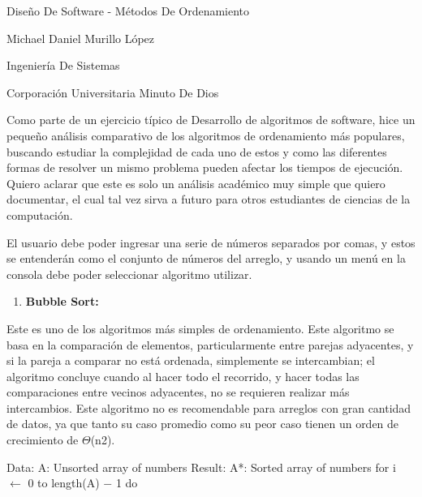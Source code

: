 ﻿\documentclass{article} %
\begin{document}


\noindent 

\noindent 

\noindent 

\noindent 

\noindent 

\noindent Dise\~{n}o De Software - M\'{e}todos De Ordenamiento

\noindent Michael Daniel Murillo L\'{o}pez

\noindent Ingenier\'{i}a De Sistemas

\noindent Corporaci\'{o}n Universitaria Minuto De Dios

\noindent 

\noindent Como parte de un ejercicio t\'{i}pico de Desarrollo de algoritmos de software, hice un peque\~{n}o an\'{a}lisis comparativo de los algoritmos de ordenamiento m\'{a}s populares, buscando estudiar la complejidad de cada uno de estos y como las diferentes formas de resolver un mismo problema pueden afectar los tiempos de ejecuci\'{o}n. Quiero aclarar que este es solo un an\'{a}lisis acad\'{e}mico muy simple que quiero documentar, el cual tal vez sirva a futuro para otros estudiantes de ciencias de la computaci\'{o}n.

\noindent El usuario debe poder ingresar una serie de n\'{u}meros separados por comas, y estos se entender\'{a}n como el conjunto de n\'{u}meros del arreglo, y usando un men\'{u} en la consola debe poder seleccionar algoritmo utilizar.

\begin{enumerate}
\item  \textbf{Bubble Sort:}
\end{enumerate}

\noindent Este es uno de los algoritmos m\'{a}s simples de ordenamiento. Este algoritmo se basa en la comparaci\'{o}n de elementos, particularmente entre parejas adyacentes, y si la pareja a comparar no est\'{a} ordenada, simplemente se intercambian; el algoritmo concluye cuando al hacer todo el recorrido, y hacer todas las comparaciones entre vecinos adyacentes, no se requieren realizar m\'{a}s intercambios.  Este algoritmo no es recomendable para arreglos con gran cantidad de datos, ya que tanto su caso promedio como su peor caso tienen un orden de crecimiento de $\Theta$(n2).

\noindent 

\noindent Data: A: Unsorted array of numbers Result: A*: Sorted array of numbers for i $\mathrm{\leftarrow}$ 0 to length(A) $\mathrm{-}$ 1 do
\end{document}
